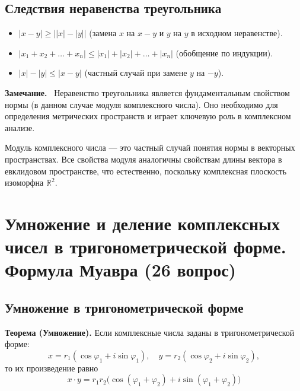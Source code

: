 \documentclass[a4paper,12pt]{article}
\newcommand{\myremark}{\textbf{Замечание.}\ }
\theoremstyle{definition}
\theoremstyle{plain}
\theoremstyle{remark}
\begin{document}
	\subsection{Следствия неравенства треугольника}
	
	\begin{tcolorbox}[colback=gray!5, colframe=gray!50, title=Полезные следствия]
		\begin{itemize}
			\item $|x - y| \geq \bigl| |x| - |y| \bigr|$ (замена $x$ на $x-y$ и $y$ на $y$ в исходном неравенстве).
			\item $|x_1 + x_2 + \dots + x_n| \leq |x_1| + |x_2| + \dots + |x_n|$ (обобщение по индукции).
			\item $|x| - |y| \leq |x - y|$ (частный случай при замене $y$ на $-y$).
		\end{itemize}
	\end{tcolorbox}
	
	\myremark
	Неравенство треугольника является фундаментальным свойством нормы (в данном случае модуля комплексного числа). Оно необходимо для определения метрических пространств и играет ключевую роль в комплексном анализе.
	
	\begin{tcolorbox}[colback=purple!5, colframe=purple!50!black, title=Заметочка]
		Модуль комплексного числа — это частный случай понятия нормы в векторных пространствах. Все свойства модуля аналогичны свойствам длины вектора в евклидовом пространстве, что естественно, поскольку комплексная плоскость изоморфна $\mathbb{R}^2$.
	\end{tcolorbox}
	
	
	
	\newpage
	\section{Умножение и деление комплексных чисел в тригонометрической форме. Формула Муавра (26 вопрос)}
	
	\subsection{Умножение в тригонометрической форме}
	
	\noindent \textbf{Теорема (Умножение).}
	Если комплексные числа заданы в тригонометрической форме:
	\[
	x = r_1(\cos \varphi_1 + i \sin \varphi_1),\quad y = r_2(\cos \varphi_2 + i \sin \varphi_2),
	\]
	то их произведение равно
	\[
	x \cdot y = r_1 r_2 \bigl(\cos(\varphi_1 + \varphi_2) + i \sin(\varphi_1 + \varphi_2)\bigr)
	\]
	
\end{document}
